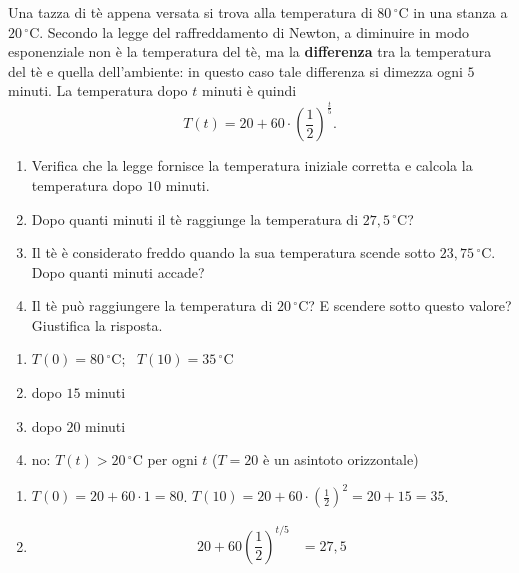 
\begin{question}[ID=6.4, subtitle={Raffreddamento di una tazza di tè}, difficulty=difficile, tags={problemi, esponenziali, decadimento, raffreddamento}]
Una tazza di tè appena versata si trova alla temperatura di $80\,{}^\circ\text{C}$ in una stanza a $20\,{}^\circ\text{C}$. Secondo la legge del raffreddamento di Newton, a diminuire in modo esponenziale non è la temperatura del tè, ma la \textbf{differenza} tra la temperatura del tè e quella dell'ambiente: in questo caso tale differenza si dimezza ogni $5$ minuti. La temperatura dopo $t$ minuti è quindi
\[
T(t) = 20 + 60 \cdot \left(\dfrac{1}{2}\right)^{\frac{t}{5}}.
\]
\begin{enumerate}[label=\alph*),leftmargin=1.8cm]
    \item Verifica che la legge fornisce la temperatura iniziale corretta e calcola la temperatura dopo $10$ minuti.
    \item Dopo quanti minuti il tè raggiunge la temperatura di $27{,}5\,{}^\circ\text{C}$?
    \item Il tè è considerato freddo quando la sua temperatura scende sotto $23{,}75\,{}^\circ\text{C}$. Dopo quanti minuti accade?
    \item Il tè può raggiungere la temperatura di $20\,{}^\circ\text{C}$? E scendere sotto questo valore? Giustifica la risposta.
\end{enumerate}
\begin{solution}
\begin{enumerate}[label=\alph*),leftmargin=1.8cm]
    \item $T(0)=80\,{}^\circ\text{C}$; \ $T(10)=35\,{}^\circ\text{C}$
    \item dopo $15$ minuti
    \item dopo $20$ minuti
    \item no: $T(t)>20\,{}^\circ\text{C}$ per ogni $t$ ($T=20$ è un asintoto orizzontale)
\end{enumerate}
\end{solution}
\begin{explanation}
\begin{enumerate}[label=\alph*),leftmargin=1.8cm]
    \item $T(0)=20+60\cdot1=80$. \quad $T(10)=20+60\cdot\left(\tfrac12\right)^2=20+15=35$.
    \item \[\begin{aligned}
    20+60\left(\dfrac12\right)^{t/5} &= 27{,}5\\

\end{aligned}\]
\end{enumerate}
\end{explanation}
\end{question}
